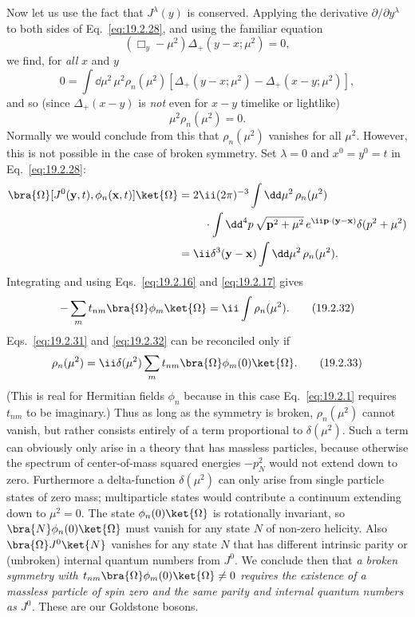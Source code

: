 Now let us use the fact that $J^\lambda(y)$ is conserved. Applying the
derivative $\partial/\partial y^\lambda$ to both sides of
Eq.~\eqref{eq:19.2.28}, and using the familiar equation
\begin{equation}
 (\Box_y-\mu^2)\Delta_+(y-x;\mu^2)=0,
 \tag{19.2.29}\label{eq:19.2.29}
\end{equation}
we find, for \emph{all} $x$ and $y$
\begin{equation}
 0=\int \dd\mu^2\,\mu^2\rho_n(\mu^2)
 \left[\Delta_+(y-x;\mu^2)-\Delta_+(x-y;\mu^2)\right],
 \tag{19.2.30}\label{eq:19.2.30}
\end{equation}
and so (since $\Delta_+(x-y)$ is \emph{not} even for $x-y$ timelike or
lightlike)
\begin{equation}
 \mu^2\rho_n(\mu^2)=0.
 \tag{19.2.31}\label{eq:19.2.31}
\end{equation}
Normally we would conclude from this that $\rho_n(\mu^2)$ vanishes for all
$\mu^2$. However, this is not possible in the case of broken symmetry. Set
$\lambda=0$ and $x^0=y^0=t$ in Eq.~\eqref{eq:19.2.28}:
\begin{align*}
 \bra{\Omega}[J^0(\mathbf y,t),\phi_n(\mathbf x,t)]\ket{\Omega}
 ={}&2\ii(2\pi)^{-3}\int \dd\mu^2\,\rho_n(\mu^2)
 \\
 &\quad{}\cdot\int \dd^4p\,
 \sqrt{\mathbf p^2+\mu^2}\,
 e^{\ii\mathbf p\cdot(\mathbf y-\mathbf x)}
 \delta(p^2+\mu^2)
 \\
 ={}&\ii\delta^3(\mathbf y-\mathbf x)
 \int \dd\mu^2\,\rho_n(\mu^2).
\end{align*}
Integrating and using Eqs.~\eqref{eq:19.2.16} and \eqref{eq:19.2.17} gives
\begin{equation}
 -\sum_m t_{nm}\bra{\Omega}\phi_m\ket{\Omega}
 =\ii\int\rho_n(\mu^2).
 \tag{19.2.32}\label{eq:19.2.32}
\end{equation}
Eqs.~\eqref{eq:19.2.31} and \eqref{eq:19.2.32} can be reconciled only if
\begin{equation}
 \rho_n(\mu^2)=\ii\delta(\mu^2)
 \sum_m t_{nm}\bra{\Omega}\phi_m(0)\ket{\Omega}.
 \tag{19.2.33}\label{eq:19.2.33}
\end{equation}
(This is real for Hermitian fields $\phi_n$ because in this case
Eq.~\eqref{eq:19.2.1} requires $t_{nm}$ to be imaginary.) Thus as long as the
symmetry is broken, $\rho_n(\mu^2)$ cannot vanish, but rather consists
entirely of a term proportional to $\delta(\mu^2)$. Such a term can obviously
only arise in a theory that has massless particles, because otherwise the
spectrum of center-of-mass squared energies $-p_N^2$ would not extend down to
zero. Furthermore a delta-function $\delta(\mu^2)$ can only arise from single
particle states of zero mass; multiparticle states would contribute a
continuum extending down to $\mu^2=0$. The state
$\phi_n(0)\ket{\Omega}$ is rotationally invariant, so
$\bra{N}\phi_n(0)\ket{\Omega}$ must vanish for any state $N$ of non-zero
helicity. Also $\bra{\Omega}J^0\ket{N}$ vanishes for any state $N$ that has
different intrinsic parity or (unbroken) internal quantum numbers from
$J^0$. We conclude then that \emph{a broken symmetry with
$t_{nm}\bra{\Omega}\phi_m(0)\ket{\Omega}\ne0$ requires the existence of a
massless particle of spin zero and the same parity and internal quantum
numbers as $J^0$.} These are our Goldstone bosons.

